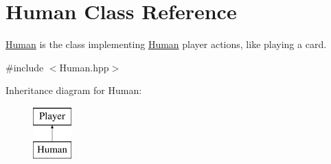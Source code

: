 \hypertarget{classHuman}{\section{\-Human \-Class \-Reference}
\label{classHuman}
}


\hyperlink{classHuman}{\-Human} is the class implementing \hyperlink{classHuman}{\-Human} player actions, like playing a card.  




{\ttfamily \#include $<$\-Human.\-hpp$>$}

\-Inheritance diagram for \-Human\-:\begin{figure}[H]
\begin{center}
\leavevmode
\includegraphics[height=2.000000cm]{classHuman}
\end{center}
\end{figure}

